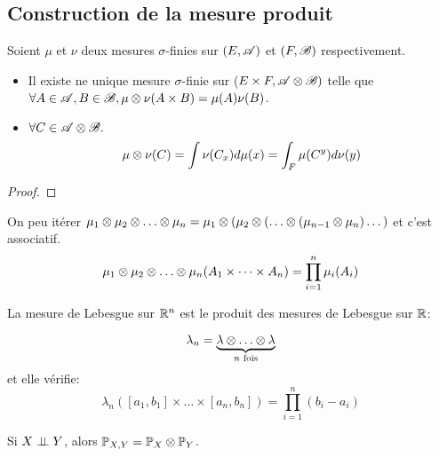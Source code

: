 \subsection{Construction de la mesure produit}

\begin{theorem}
	Soient $\mu$ et $\nu$ deux mesures $\sigma$-finies sur $(E, \mathscr{A})$ et $(F, \mathscr{B})$ respectivement.

	\begin{itemize}
		\item Il existe ne unique mesure $\sigma$-finie sur ($E \times F, \mathscr{A} \otimes \mathscr{B})$ telle que $\forall A \in \mathscr{A}, B \in \mathscr{B}, \mu \otimes \nu(A \times B) = \mu(A) \nu(B)$.
		\item $\forall C \in \mathscr{A} \otimes \mathscr{B}. $
		      $$ \mu \otimes \nu(C) = \int \nu(C_x) d \mu(x) = \int_F \mu(C^y) d \nu(y) $$
	\end{itemize}
\end{theorem}

\begin{proof}
\end{proof}

\begin{remarque}
	On peu itérer $\mu_1 \xor \mu_2 \xor \dots \xor \mu_n = \mu_1 \xor (\mu_2 \xor (\dots \xor (\mu_{n-1} \xor \mu_n)\dots)$ et c'est associatif.
	$$ \mu_1 \xor \mu_2 \xor \dots \xor \mu_n(A_1 \times \dots \times A_n) = \prod_{i=1}^n \mu_i(A_i) $$
\end{remarque}


\begin{example}
	La mesure de Lebesgue sur $\mathbb{R}^n$ est le produit des mesures de Lebesgue sur $\mathbb{R}$:

	$$\lambda_n = \underbrace{\lambda \xor \dots \xor \lambda}_{n \text{ fois}}$$
	et elle vérifie:
	$$\lambda_n([a_1, b_1] \times \dots \times [a_n, b_n]) = \prod_{i=1}^n (b_i - a_i)$$
\end{example}

\begin{remarque}
	Si $X \perp\!\!\! \perp Y$, alors $\mathbb{P}_{X,Y} = \mathbb{P}_X \otimes \mathbb{P}_Y$.
\end{remarque}
